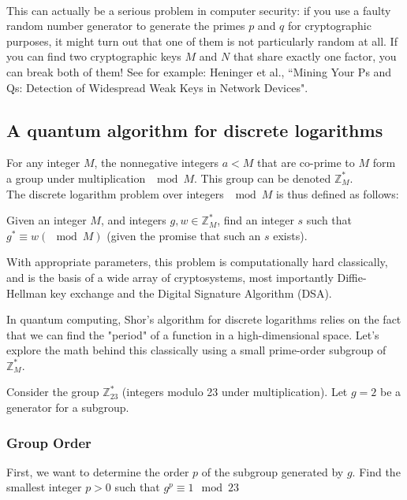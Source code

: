 \noindent{}\\

This can actually be a serious problem in computer security: if you use a faulty random number generator to generate the primes $p$ and $q$  for cryptographic purposes, it might turn out that one of them is not particularly random at all. If you can find two cryptographic keys $M$ and $N$ that share exactly one factor, you can break both of them! See for example: Heninger et al., ``Mining Your Ps and Qs: Detection of Widespread Weak Keys in Network Devices".


\newpage
\subsection{A quantum algorithm for discrete logarithms}
For any integer $M$, the nonnegative integers $a<M$ that are co-prime to $M$ form a group under multiplication $\mod M$. This group can be denoted $\mathbb{Z}^*_M$. \\

The discrete logarithm problem over integers $\mod M$ is thus defined as follows:
\begin{definition}
    Given an integer $M$, and integers $g, w \in \mathbb{Z}^*_M$, find an integer $s$ such that $g^* \equiv w (\mod M)$ (given the promise that such an $s$ exists).
\end{definition}

With appropriate parameters, this problem is computationally hard classically, and is the basis of a wide array of cryptosystems, most importantly Diffie-Hellman key exchange and the Digital Signature Algorithm (DSA).

In quantum computing, Shor's algorithm for discrete logarithms relies on the fact that we can find the "period" of a function in a high-dimensional space. Let's explore the math behind this classically using a small prime-order subgroup of $\mathbb{Z}^*_M$.

Consider the group $\mathbb{Z}^*_{23}$ (integers modulo 23 under multiplication). Let $g=2$ be a generator for a subgroup.

\subsubsection{Group Order}
First, we want to determine the order $p$ of the subgroup generated by $g$. Find the smallest integer $p > 0$ such that $g^p \equiv 1\mod{23}$

